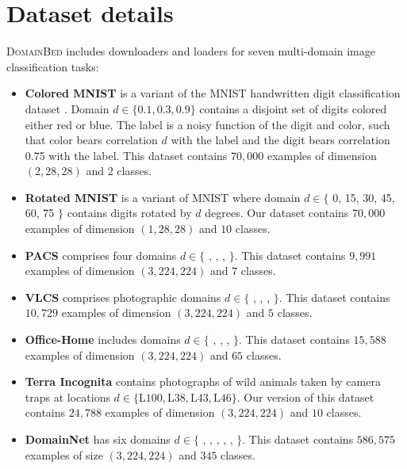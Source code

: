 \documentclass{article}
\newcommand{\domainbed}{\textsc{DomainBed}\xspace}
\begin{document}
\clearpage
\newpage

\section{Dataset details}
\label{sec:dataset_details}

\domainbed includes downloaders and loaders for seven multi-domain image classification tasks: 

\begin{itemize}
    \item \textbf{Colored MNIST} \citep{arjovsky2019invariant} is a variant of the MNIST handwritten digit classification dataset \citep{lecun1998mnist}. Domain $d \in \{0.1, 0.3, 0.9\}$ contains a disjoint set of digits colored either red or blue. The label is a noisy function of the digit and color, such that color bears correlation $d$ with the label and the digit bears correlation 0.75 with the label. This dataset contains $70,000$ examples of dimension $(2, 28, 28)$ and $2$ classes.
    \item \textbf{Rotated MNIST} \citep{ghifary2015domain} is a variant of MNIST where domain $d \in \{$ 0, 15, 30, 45, 60, 75 $\}$ contains digits rotated by $d$ degrees. Our dataset contains $70,000$ examples of dimension $(1, 28, 28)$ and $10$ classes.
    \item \textbf{PACS} \citep{Li_2017_ICCV} comprises four domains $d \in \{$ , , ,  $\}$. This dataset contains $9,991$ examples of dimension $(3, 224, 224)$ and $7$ classes.
    \item \textbf{VLCS} \citep{fang2013unbiased} comprises photographic domains $d \in \{$ , , ,  $\}$. This dataset contains $10,729$ examples of dimension $(3, 224, 224)$ and $5$ classes.
    \item \textbf{Office-Home} \citep{venkateswara2017Deep} includes domains $d \in \{$ , , ,  $\}$. This dataset contains $15,588$ examples of dimension $(3, 224, 224)$ and $65$ classes.
    \item \textbf{Terra Incognita} \citep{beery2018recognition} contains photographs of wild animals taken by camera traps at locations $d \in \{ \text{L100}, \text{L38}, \text{L43}, \text{L46}\}$. Our version of this dataset contains $24,788$ examples of dimension $(3, 224, 224)$ and $10$ classes.
    \item \textbf{DomainNet} \citep{peng2019moment} has six domains $d \in \{$ , , , , ,  $\}$. This dataset contains $586,575$ examples of size $(3, 224, 224)$ and $345$ classes.
\end{itemize}
\end{document}
